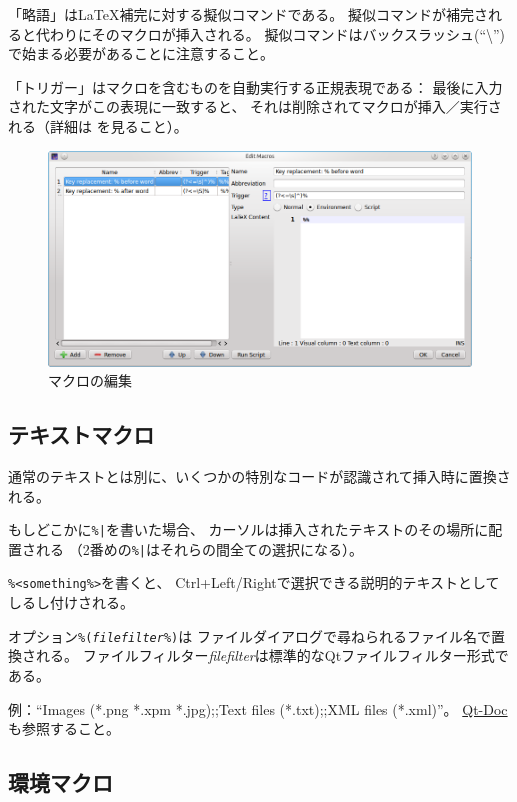「略語」はLaTeX補完に対する擬似コマンドである。
擬似コマンドが補完されると代わりにそのマクロが挿入される。
擬似コマンドはバックスラッシュ(``\textbackslash{}'')で始まる必要があることに注意すること。

「トリガー」はマクロを含むものを自動実行する正規表現である：
最後に入力された文字がこの表現に一致すると、
それは削除されてマクロが挿入／実行される（詳細は
を見ること）。

\begin{figure}[H]
  \centering
  \includegraphics[width=.8\linewidth]{doc17.png}
  \caption{マクロの編集}
\end{figure}

\subsection{テキストマクロ}

通常のテキストとは別に、いくつかの特別なコードが認識されて挿入時に置換される。

もしどこかに\verb+%|+を書いた場合、
カーソルは挿入されたテキストのその場所に配置される
（2番めの\verb+%|+はそれらの間全ての選択になる）。

\verb+%<something%>+を書くと、
Ctrl+Left/Rightで選択できる説明的テキストとしてしるし付けされる。

オプション\texttt{\%(\emph{filefilter}\%)}は
ファイルダイアログで尋ねられるファイル名で置換される。
ファイルフィルター\emph{filefilter}は標準的なQtファイルフィルター形式である。

例：``Images (*.png *.xpm *.jpg);;Text files (*.txt);;XML files (*.xml)''。
\href{http://qt-project.org/doc/qt-4.8/qfiledialog.html\#getOpenFileName}{Qt-Doc}も参照すること。

\subsection{環境マクロ}

